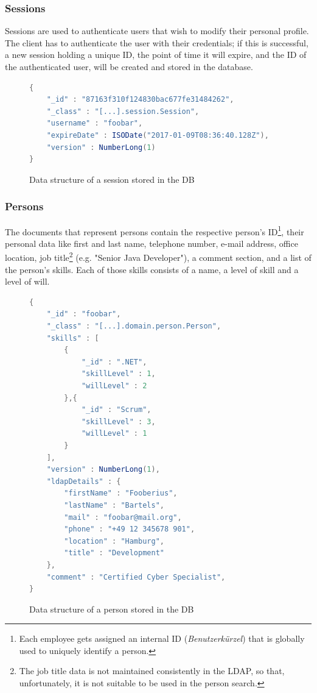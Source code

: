 \subsubsection{Sessions}
Sessions are used to authenticate users that wish to modify their personal profile. The client has to authenticate the user with their credentials; if this is successful, a new session holding a unique ID, the point of time it will expire, and the ID of the authenticated user, will be created and stored in the database.

\begin{figure}[h]
\begin{lstlisting}[language=Java]
{
	"_id" : "87163f310f124830bac677fe31484262",
	"_class" : "[...].session.Session",
	"username" : "foobar",
	"expireDate" : ISODate("2017-01-09T08:36:40.128Z"),
	"version" : NumberLong(1)
}
\end{lstlisting}
\caption[Data Structure: Session]{Data structure of a session stored in the DB}
\end{figure}
\subsubsection{Persons}
\label{db:person}
The documents that represent persons contain the respective person's ID\footnote{Each employee gets assigned an internal ID (\textit{Benutzerkürzel}) that is globally used to uniquely identify a person.}, their personal data like first and last name, telephone number, e-mail address, office location, job title\footnote{The job title data is not maintained consistently in the LDAP, so that, unfortunately, it is not suitable to be used in the person search.} (e.g. "Senior Java Developer"), a comment section, and a list of the person's skills. Each of those skills consists of a name, a level of skill and a level of will.
\begin{figure}[h]
\begin{lstlisting}[language=Java]
{
	"_id" : "foobar",
	"_class" : "[...].domain.person.Person",
	"skills" : [
		{
			"_id" : ".NET",
			"skillLevel" : 1,
			"willLevel" : 2
		},{
			"_id" : "Scrum",
			"skillLevel" : 3,
			"willLevel" : 1
		}
	],
	"version" : NumberLong(1),
	"ldapDetails" : {
		"firstName" : "Fooberius",
		"lastName" : "Bartels",
		"mail" : "foobar@mail.org",
		"phone" : "+49 12 345678 901",
		"location" : "Hamburg",
		"title" : "Development"
	},
	"comment" : "Certified Cyber Specialist",
}
\end{lstlisting}
\caption[Data Structure: Person]{Data structure of a person stored in the DB}
\end{figure}


